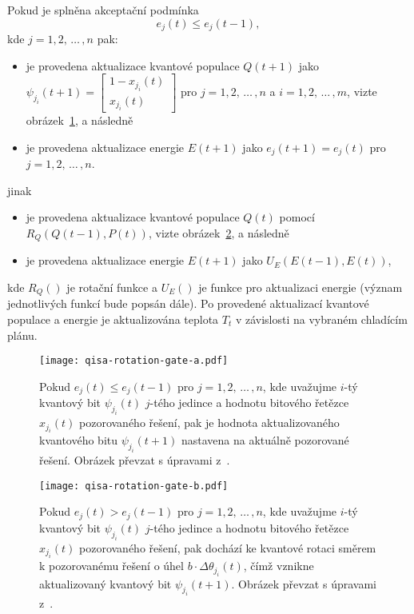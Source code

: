 Pokud je splněna akceptační podmínka
\begin{equation}\label{eq:qisa-if}
    e_j\left(t\right) \leq e_j\left(t-1\right),
\end{equation}
kde $j = 1,2,\,\dots\,,n$ pak:
\begin{itemize}
    \item je provedena aktualizace kvantové populace $Q\left(t+1\right)$ jako $\psi_{j_i}\left(t+1\right) = \begin{bmatrix} 1 - x_{j_i}\left(t\right) \\ x_{j_i}\left(t\right) \end{bmatrix}$ pro $j=1,2,\,\dots\,,n$ a $i=1,2,\,\dots\,,m$, vizte obrázek~\ref{fig:rotation-gate-a}, a následně
    \item je provedena aktualizace energie $E\left(t+1\right)$ jako $e_j\left(t+1\right) = e_j\left(t\right)$ pro $j=1,2,\,\dots\,,n$.
\end{itemize}
jinak
\begin{itemize}
    \item je provedena aktualizace kvantové populace $Q\left(t\right)$ pomocí $R_Q\left(Q\left(t-1\right), P\left(t\right) \right)$, vizte obrázek~\ref{fig:rotation-gate-b}, a následně
    \item je provedena aktualizace energie $E\left(t+1\right)$ jako $U_E\left(E\left(t-1\right), E\left(t\right)\right)$,
\end{itemize}
kde $R_Q\left(\right)$ je rotační funkce a $U_E\left(\right)$ je funkce pro aktualizaci energie (význam jednotlivých funkcí bude popsán dále).
Po provedené aktualizací kvantové populace a energie je aktualizována teplota $T_t$ v závislosti na vybraném chladícím plánu.

\begin{figure}[ht!]
    \centering
    \texttt{[image: qisa-rotation-gate-a.pdf]}
    \caption{Pokud $e_j\left(t\right) \leq e_j\left(t-1\right)$ pro $j = 1,2,\,\dots\,,n$, kde uvažujme $i$-tý kvantový bit $\psi_{j_i}\left(t\right)$ $j$-tého jedince a hodnotu bitového řetězce $x_{j_i} \left(t\right)$ pozorovaného řešení, pak je hodnota aktualizovaného kvantového bitu $\psi_{j_i}\left(t+1\right)$ nastavena na aktuálně pozorované řešení. Obrázek převzat s úpravami z~\cite{qisa}.}
    \label{fig:rotation-gate-a}
\end{figure}

\begin{figure}[ht!]
    \centering
    \texttt{[image: qisa-rotation-gate-b.pdf]}
    \caption{Pokud $e_j\left(t\right) > e_j\left(t-1\right)$ pro $j = 1,2,\,\dots\,,n$, kde uvažujme $i$-tý kvantový bit $\psi_{j_i}\left(t\right)$ $j$-tého jedince a hodnotu bitového řetězce $x_{j_i} \left(t\right)$ pozorovaného řešení, pak dochází ke kvantové rotaci směrem k pozorovanému řešení o úhel $b \cdot \Delta\theta_{j_i}\left(t\right)$, čímž vznikne aktualizovaný kvantový bit $\psi_{j_i}\left(t+1\right)$. Obrázek převzat s úpravami z~\cite{qisa}.}
    \label{fig:rotation-gate-b}
\end{figure}


